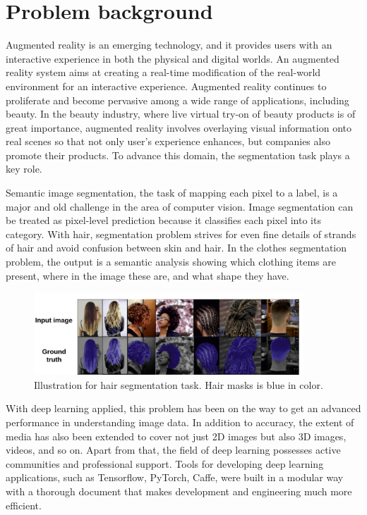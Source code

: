 \section{Problem background} \label{sec:pb}

Augmented reality is an emerging technology, and it provides users with an interactive experience in both the physical and digital worlds. An augmented reality system aims at creating a real-time modification of the real-world environment for an interactive experience. Augmented reality continues to proliferate and become pervasive among a wide range of applications, including beauty. In the beauty industry, where live virtual try-on of beauty products is of great importance, augmented reality involves overlaying visual information onto real scenes so that not only user’s experience enhances, but companies also promote their products. To advance this domain, the segmentation task plays a key role.
\par
Semantic image segmentation, the task of mapping each pixel to a label, is a major and old challenge in the area of computer vision. Image segmentation can be treated as pixel-level prediction because it classifies each pixel into its category. With hair, segmentation problem strives for even fine details of strands of hair and avoid confusion between skin and hair. In the clothes segmentation problem, the output is a semantic analysis showing which clothing items are present, where in the image these are, and what shape they have.

\begin{figure} [H]
    \centering
    \includegraphics[width=0.9\textwidth]{chapter1/image/hair seg.png}
    \caption{Illustration for hair segmentation task. Hair masks is blue in color.}
    \label{fig:c1hairseg}
\end{figure}

With deep learning applied, this problem has been on the way to get an advanced performance in understanding image data. In addition to accuracy, the extent of media has also been extended to cover not just 2D images but also 3D images, videos, and so on. Apart from that, the field of deep learning possesses active communities and professional support. Tools for developing deep learning applications, such as Tensorflow, PyTorch, Caffe, were built in a modular way with a thorough document that makes development and engineering much more efficient. 
\par

